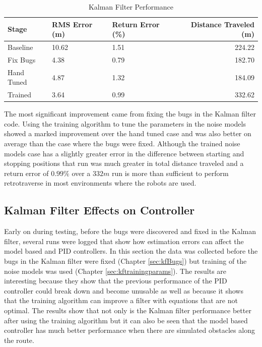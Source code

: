 \begin{table}[ht!]
\caption{Kalman Filter Performance}
\small
\centering
\begin{tabular}{@{}lllr@{}} \toprule
Stage      & RMS Error (m)  & Return Error (\%) & Distance Traveled (m) \\ \midrule
Baseline   & 10.62          & 1.51              & 224.22 \\
Fix Bugs   & 4.38           & 0.79              & 182.70 \\
Hand Tuned & 4.87           & 1.32              & 184.09 \\
Trained    & 3.64           & 0.99              & 332.62 \\ \bottomrule
\end{tabular}
\label{tab:resultsKF}
\end{table}

The most significant improvement came from fixing the bugs in the Kalman filter code. Using the training algorithm to tune the parameters in the noise models showed a marked improvement over the hand tuned case and was also better on average than the case where the bugs were fixed. Although the trained noise models case has a slightly greater error in the difference between starting and stopping positions that run was much greater in total distance traveled and a return error of $0.99\%$ over a $332m$ run is more than sufficient to perform retrotraverse in most environments where the robots are used.

\subsection{Kalman Filter Effects on Controller}
Early on during testing, before the bugs were discovered and fixed in the Kalman filter, several runs were logged that show how estimation errors can affect the model based and PID controllers. In this section the data was collected before the bugs in the Kalman filter were fixed (Chapter \ref{sec:kfBugs}) but training of the noise models was used (Chapter \ref{sec:kftrainingparams}). The results are interesting because they show that the previous performance of the PID controller could break down and become unusable as well as because it shows that the training algorithm can improve a filter with equations that are not optimal. The results show that not only is the Kalman filter performance better after using the training algorithm but it can also be seen that the model based controller has much better performance when there are simulated obstacles along the route.

